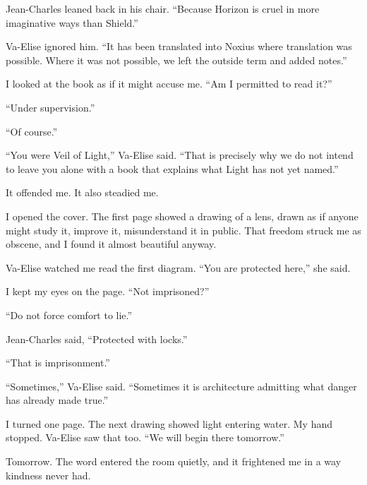 Jean-Charles leaned back in his chair. ``Because Horizon is cruel in more imaginative ways than Shield.''\par

Va-Elise ignored him. ``It has been translated into Noxius where translation was possible. Where it was not possible, we left the outside term and added notes.''\par

I looked at the book as if it might accuse me. ``Am I permitted to read it?''\par

``Under supervision.''\par

``Of course.''\par

``You were Veil of Light,'' Va-Elise said. ``That is precisely why we do not intend to leave you alone with a book that explains what Light has not yet named.''\par

It offended me. It also steadied me.\par

I opened the cover. The first page showed a drawing of a lens, drawn as if anyone might study it, improve it, misunderstand it in public. That freedom struck me as obscene, and I found it almost beautiful anyway.\par

Va-Elise watched me read the first diagram. ``You are protected here,'' she said.\par

I kept my eyes on the page. ``Not imprisoned?''\par

``Do not force comfort to lie.''\par

Jean-Charles said, ``Protected with locks.''\par

``That is imprisonment.''\par

``Sometimes,'' Va-Elise said. ``Sometimes it is architecture admitting what danger has already made true.''\par

I turned one page. The next drawing showed light entering water. My hand stopped. Va-Elise saw that too. ``We will begin there tomorrow.''\par

Tomorrow. The word entered the room quietly, and it frightened me in a way kindness never had.\par

